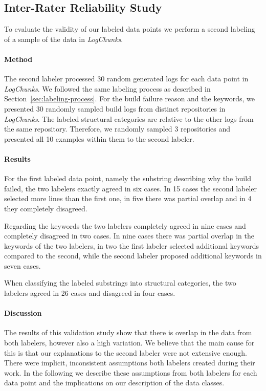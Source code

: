 \documentclass[\myrootdir/main.tex]{subfiles}
\begin{document}
\subsection{Inter-Rater Reliability Study}
To evaluate the validity of our labeled data points we perform a second labeling of a sample of the data in \emph{LogChunks}.

\paragraph{Method}
The second labeler processed 30 random generated logs for each data point in \emph{LogChunks}.
We followed the same labeling process as described in Section~\ref{sec:labeling-process}.
For the build failure reason and the keywords, we presented 30 randomly sampled build logs from distinct repositories in \emph{LogChunks}.
The labeled structural categories are relative to the other logs from the same repository.
Therefore, we randomly sampled 3 repositories and presented all 10 examples within them to the second labeler.

\paragraph{Results}
For the first labeled data point, namely the substring describing why the build failed, the two labelers exactly agreed in six cases.
In 15 cases the second labeler selected more lines than the first one, in five there was partial overlap and in 4 they completely disagreed.

Regarding the keywords the two labelers completely agreed in nine cases and completely disagreed in two cases.
In nine cases there was partial overlap in the keywords of the two labelers, in two the first labeler selected additional keywords compared to the second, while the second labeler proposed additional keywords in seven cases.

When classifying the labeled substrings into structural categories, the two labelers agreed in 26 cases and disagreed in four cases.

\paragraph{Discussion}
The results of this validation study show that there is overlap in the data from both labelers, however also a high variation.
We believe that the main cause for this is that our explanations to the second labeler were not extensive enough.
There were implicit, inconsistent assumptions both labelers created during their work.
In the following we describe these assumptions from both labelers for each data point and the implications on our description of the data classes.
\end{document}
